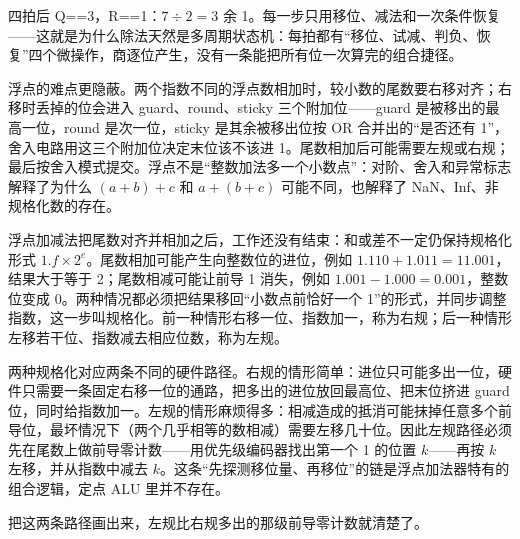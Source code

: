 四拍后 Q==3，R==1：$7 \div 2 = 3$ 余 1。每一步只用移位、减法和一次条件恢复——这就是为什么除法天然是多周期状态机：每拍都有“移位、试减、判负、恢复”四个微操作，商逐位产生，没有一条能把所有位一次算完的组合捷径。

浮点的难点更隐蔽。两个指数不同的浮点数相加时，较小数的尾数要右移对齐；右移时丢掉的位会进入 guard、round、sticky 三个附加位——guard 是被移出的最高一位，round 是次一位，sticky 是其余被移出位按 OR 合并出的“是否还有 1”，舍入电路用这三个附加位决定末位该不该进 1。尾数相加后可能需要左规或右规；最后按舍入模式提交。浮点不是“整数加法多一个小数点”：对阶、舍入和异常标志解释了为什么 \((a+b)+c\) 和 \(a+(b+c)\) 可能不同，也解释了 NaN、Inf、非规格化数的存在。

浮点加减法把尾数对齐并相加之后，工作还没有结束：和或差不一定仍保持规格化形式 \(1.f\times2^{e}\)。尾数相加可能产生向整数位的进位，例如 \(1.110+1.011=11.001\)，结果大于等于 2；尾数相减可能让前导 1 消失，例如 \(1.001-1.000=0.001\)，整数位变成 0。两种情况都必须把结果移回“小数点前恰好一个 1”的形式，并同步调整指数，这一步叫规格化。前一种情形右移一位、指数加一，称为右规；后一种情形左移若干位、指数减去相应位数，称为左规。

两种规格化对应两条不同的硬件路径。右规的情形简单：进位只可能多出一位，硬件只需要一条固定右移一位的通路，把多出的进位放回最高位、把末位挤进 guard 位，同时给指数加一。左规的情形麻烦得多：相减造成的抵消可能抹掉任意多个前导位，最坏情况下（两个几乎相等的数相减）需要左移几十位。因此左规路径必须先在尾数上做前导零计数——用优先级编码器找出第一个 1 的位置 \(k\)——再按 \(k\) 左移，并从指数中减去 \(k\)。这条“先探测移位量、再移位”的链是浮点加法器特有的组合逻辑，定点 ALU 里并不存在。

把这两条路径画出来，左规比右规多出的那级前导零计数就清楚了。

